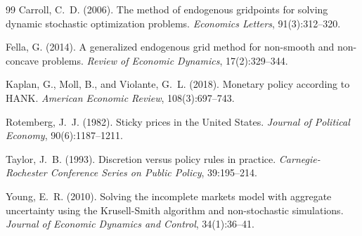 \documentclass[12pt]{article}
\begin{document}
\begin{thebibliography}{99}
Carroll, C.~D. (2006).
\newblock The method of endogenous gridpoints for solving dynamic stochastic optimization problems.
\newblock \textit{Economics Letters}, 91(3):312--320.

Fella, G. (2014).
\newblock A generalized endogenous grid method for non-smooth and non-concave problems.
\newblock \textit{Review of Economic Dynamics}, 17(2):329--344.

Kaplan, G., Moll, B., and Violante, G.~L. (2018).
\newblock Monetary policy according to {HANK}.
\newblock \textit{American Economic Review}, 108(3):697--743.

Rotemberg, J.~J. (1982).
\newblock Sticky prices in the {United States}.
\newblock \textit{Journal of Political Economy}, 90(6):1187--1211.

Taylor, J.~B. (1993).
\newblock Discretion versus policy rules in practice.
\newblock \textit{Carnegie-Rochester Conference Series on Public Policy}, 39:195--214.

Young, E.~R. (2010).
\newblock Solving the incomplete markets model with aggregate uncertainty using the {Krusell-Smith} algorithm and non-stochastic simulations.
\newblock \textit{Journal of Economic Dynamics and Control}, 34(1):36--41.

\end{thebibliography}

\end{document}
